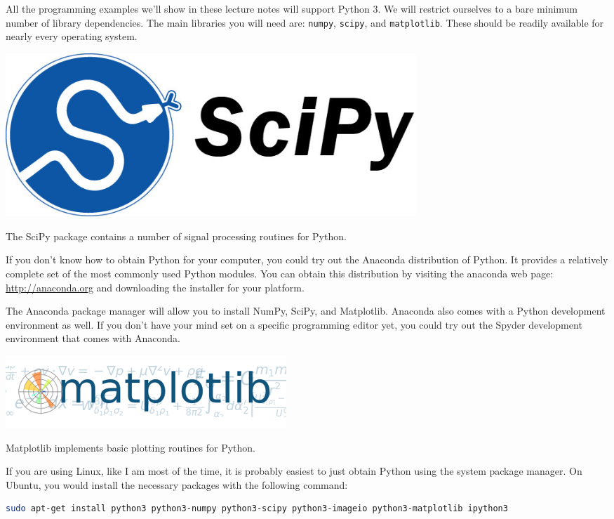 All the programming examples we'll show in these lecture notes will
support Python 3. We will restrict ourselves to a bare minimum number
of library dependencies. The main libraries you will need are:
\verb|numpy|, \verb|scipy|, and \verb|matplotlib|. These should be
readily available for nearly every operating system.

\begin{marginfigure}
  \begin{center}
    \includegraphics[width=0.68\textwidth]{ch02/figures/scipy.jpg}
  \end{center}
  \caption{The SciPy package contains a number of signal processing routines for Python.}
\end{marginfigure}

If you don't know how to obtain Python for your computer, you could
try out the Anaconda distribution of Python. It provides a relatively
complete set of the most commonly used Python modules. You can obtain
this distribution by visiting the anaconda web page:
\url{http://anaconda.org} and downloading the installer for your
platform.

The Anaconda package manager will allow you to install NumPy, SciPy,
and Matplotlib. Anaconda also comes with a Python development
environment as well. If you don't have your mind set on a specific
programming editor yet, you could try out the Spyder development
environment that comes with Anaconda.

\begin{marginfigure}
  \includegraphics[width=\textwidth]{ch02/figures/matplotlib.png}
  \caption{Matplotlib implements basic plotting routines for Python.}
\end{marginfigure}

If you are using Linux, like I am most of the time, it is
probably easiest to just obtain Python using the system package
manager. On Ubuntu, you would install the necessary packages with the following command:
\begin{lstlisting}[language=sh,caption=Installing Python on Ubuntu Linux,label=lst:linuxinstall]
sudo apt-get install python3 python3-numpy python3-scipy python3-imageio python3-matplotlib ipython3
\end{lstlisting}

